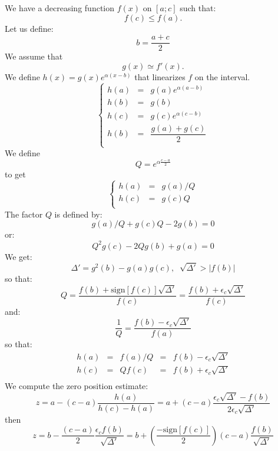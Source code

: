 \documentclass[aps,12pt]{revtex4}
\begin{document}
We have a decreasing function $f(x)$ on $[a;c]$ such that:
$$f(c)\leq f(a).$$
Let us define:
$$
	b = \dfrac{a+c}{2}
$$
We assume that 
$$g(x)\simeq f'(x).$$
We define $h(x)=g(x)e^{\alpha(x-b)}$ that linearizes $f$ on the interval.
$$
\left\lbrace
\begin{array}{rcl}
	h(a) & = & g(a)e^{\alpha(a-b)}\\
	h(b) & = & g(b)\\
	h(c) & = & g(c) e^{\alpha(c-b)}\\
	h(b) & = & \dfrac{g(a)+g(c)}{2}\\
\end{array}
\right.
$$
We define
$$
Q = e^{\alpha\frac{c-a}{2}}
$$
to get
$$	
\left\lbrace
\begin{array}{rcl}
	h(a) & = & g(a)/Q\\
 	h(c) & = & g(c)Q\\
\end{array}
\right.
$$
The factor $Q$ is defined by:
$$
	g(a)/Q + g(c)Q - 2g(b) = 0
$$
or:
$$
	Q^2 g(c) - 2Qg(b) + g(a) = 0 
$$
We get:
$$
	\Delta' = g^2(b) - g(a)g(c), \;\; \sqrt{\Delta'} > |f(b)|
$$
so that:
$$
	Q = \dfrac{f(b) + \mathrm{sign}[ f(c) ] \sqrt{\Delta'}}{f(c)} = \dfrac{f(b) + \epsilon_c \sqrt{\Delta'}}{f(c)}
$$
and:
$$
	\dfrac{1}{Q} = \frac{f(b) - \epsilon_c \sqrt{\Delta'}}{f(a)}
$$
so that:
$$
\begin{array}{rcccl}
	h(a) & = & f(a)/Q & = & f(b) - \epsilon_c \sqrt{\Delta'}\\
	h(c) & = & Qf(c)  & = & f(b) + \epsilon_c \sqrt{\Delta'}\\
\end{array}
$$
We compute the zero position estimate:
$$
	z = a - (c-a) \dfrac{h(a)}{h(c)-h(a)} = a + (c-a) \dfrac{\epsilon_c \sqrt{\Delta'} - f(b)}{2 \epsilon_c \sqrt{\Delta'}}
$$
then
$$
	z = b - \dfrac{(c-a)}{2} \dfrac{\epsilon_c f(b)}{\sqrt{\Delta'}} = b + \left(\dfrac{-\mathrm{sign}[ f(c) ]}{2}\right) (c-a) \dfrac{f(b)}{\sqrt{\Delta'}}
$$
 
\end{document}

